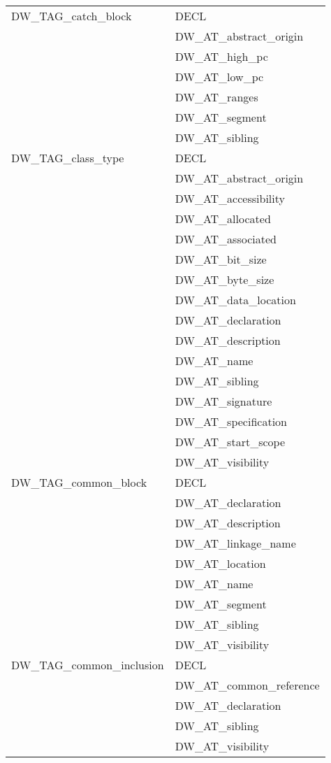 \begin{longtable}{l|p{8cm}}
 
DW\_TAG\_catch\_block
&DECL \\
&DW\_AT\_abstract\_origin \\
&DW\_AT\_high\_pc \\
&DW\_AT\_low\_pc \\
&DW\_AT\_ranges \\
&DW\_AT\_segment \\
&DW\_AT\_sibling \\

DW\_TAG\_class\_type

&DECL \\
&DW\_AT\_abstract\_origin \\
&DW\_AT\_accessibility \\
&DW\_AT\_allocated \\
&DW\_AT\_associated \\
&DW\_AT\_bit\_size \\
&DW\_AT\_byte\_size \\
&DW\_AT\_data\_location \\
&DW\_AT\_declaration \\
&DW\_AT\_description \\
&DW\_AT\_name \\
&DW\_AT\_sibling \\
&DW\_AT\_signature \\
&DW\_AT\_specification \\
&DW\_AT\_start\_scope \\
&DW\_AT\_visibility \\


DW\_TAG\_common\_block
&DECL \\
&DW\_AT\_declaration \\
&DW\_AT\_description \\
&DW\_AT\_linkage\_name \\
&DW\_AT\_location \\
&DW\_AT\_name \\
&DW\_AT\_segment \\
&DW\_AT\_sibling \\
&DW\_AT\_visibility \\

DW\_TAG\_common\_inclusion
&DECL \\
&DW\_AT\_common\_reference \\
&DW\_AT\_declaration \\
&DW\_AT\_sibling \\
&DW\_AT\_visibility \\



\end{longtable}
